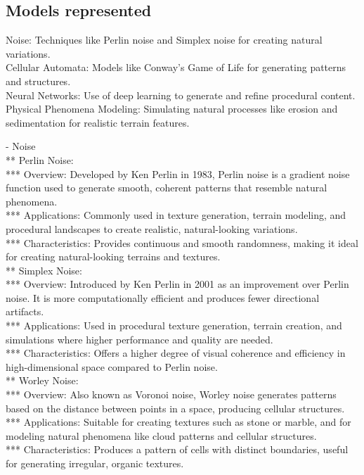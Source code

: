 \subsection{Models represented}
Noise: Techniques like Perlin noise and Simplex noise for creating natural variations. \\
Cellular Automata: Models like Conway's Game of Life for generating patterns and structures. \\
Neural Networks: Use of deep learning to generate and refine procedural content. \\
Physical Phenomena Modeling: Simulating natural processes like erosion and sedimentation for realistic terrain features. 

- Noise \\
** Perlin Noise: \\
*** Overview: Developed by Ken Perlin in 1983, Perlin noise is a gradient noise function used to generate smooth, coherent patterns that resemble natural phenomena. \\
*** Applications: Commonly used in texture generation, terrain modeling, and procedural landscapes to create realistic, natural-looking variations. \\
*** Characteristics: Provides continuous and smooth randomness, making it ideal for creating natural-looking terrains and textures. \\
** Simplex Noise: \\
*** Overview: Introduced by Ken Perlin in 2001 as an improvement over Perlin noise. It is more computationally efficient and produces fewer directional artifacts. \\
*** Applications: Used in procedural texture generation, terrain creation, and simulations where higher performance and quality are needed. \\
*** Characteristics: Offers a higher degree of visual coherence and efficiency in high-dimensional space compared to Perlin noise. \\
** Worley Noise: \\
*** Overview: Also known as Voronoi noise, Worley noise generates patterns based on the distance between points in a space, producing cellular structures. \\
*** Applications: Suitable for creating textures such as stone or marble, and for modeling natural phenomena like cloud patterns and cellular structures. \\
*** Characteristics: Produces a pattern of cells with distinct boundaries, useful for generating irregular, organic textures. \\
